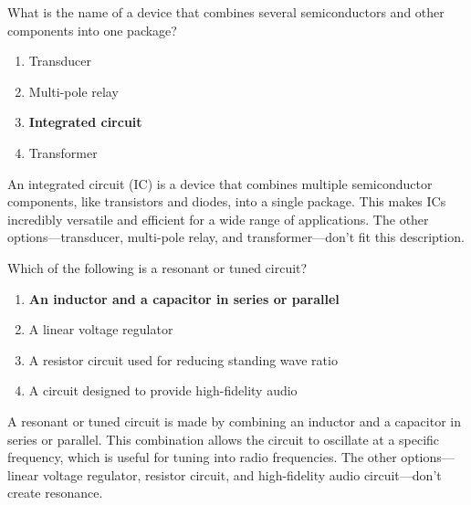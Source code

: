 \begin{tcolorbox}[colback=gray!10!white,colframe=black!75!black,title={T6D09}]
What is the name of a device that combines several semiconductors and other components into one package?
\begin{enumerate}[label=\Alph*),noitemsep]
    \item Transducer
    \item Multi-pole relay
    \item \textbf{Integrated circuit}
    \item Transformer
\end{enumerate}
\end{tcolorbox}
An integrated circuit (IC) is a device that combines multiple semiconductor components, like transistors and diodes, into a single package. This makes ICs incredibly versatile and efficient for a wide range of applications. The other options—transducer, multi-pole relay, and transformer—don’t fit this description.


\begin{tcolorbox}[colback=gray!10!white,colframe=black!75!black,title={T6D11}]
Which of the following is a resonant or tuned circuit?
\begin{enumerate}[label=\Alph*),noitemsep]
    \item \textbf{An inductor and a capacitor in series or parallel}
    \item A linear voltage regulator
    \item A resistor circuit used for reducing standing wave ratio
    \item A circuit designed to provide high-fidelity audio
\end{enumerate}
\end{tcolorbox}
A resonant or tuned circuit is made by combining an inductor and a capacitor in series or parallel. This combination allows the circuit to oscillate at a specific frequency, which is useful for tuning into radio frequencies. The other options—linear voltage regulator, resistor circuit, and high-fidelity audio circuit—don’t create resonance.




